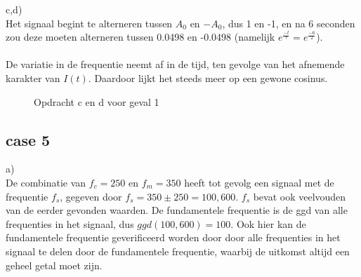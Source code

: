 \documentclass{article}
\begin{document}
c,d)\\
Het signaal begint te alterneren tussen $A_0$ en $-A_0$, dus 1 en -1, en na 6 seconden zou deze moeten alterneren tussen 0.0498 en -0.0498 (namelijk $e^\frac{-t}{\tau} = e^\frac{-6}{2}$).\\
\\
De variatie in de frequentie neemt af in de tijd, ten gevolge van het afnemende karakter van $I(t)$. Daardoor lijkt het steeds meer op een gewone cosinus.
\begin{figure}[h]
  \centering
  \caption{Opdracht c en d voor geval 1}
  \label{fig:case1b}
\end{figure}

\newpage 
\subsection{case 5}
a)\\
De combinatie van $f_c = 250$ en $f_m = 350$ heeft tot gevolg een signaal met de frequentie $f_s$, gegeven door $f_s = 350 \pm 250 = {100, 600}$. $f_s$ bevat ook veelvouden van de eerder gevonden waarden. De fundamentele frequentie is de ggd van alle frequenties in het signaal, dus $ggd(100, 600) = 100$. Ook hier kan de fundamentele frequentie geverificeerd worden door door alle frequenties in het signaal te delen door de fundamentele frequentie, waarbij de uitkomst altijd een geheel getal moet zijn.
\end{document}
